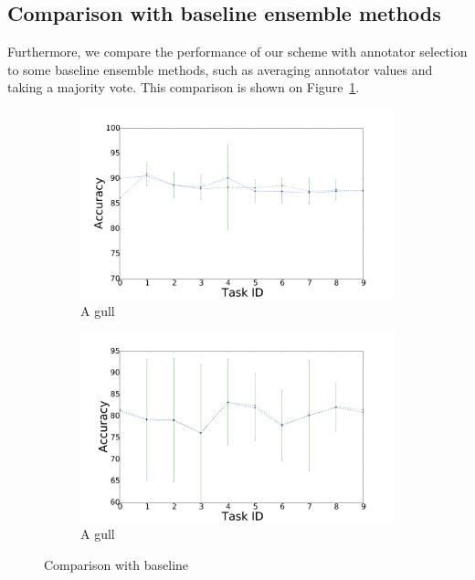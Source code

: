 \documentclass{llncs}
\begin{document}
\subsection{Comparison with baseline ensemble methods}

Furthermore, we compare the performance of our scheme with annotator selection to some baseline ensemble methods, such as averaging annotator values and taking a majority vote. %
This comparison is shown on Figure~\ref{fig:baseline}.

\begin{figure}[!htb]
    \centering
    \begin{subfigure}[b]{0.45\textwidth}
        \includegraphics[width=\textwidth]{figures/comp_average}
        \caption{A gull}
    \end{subfigure}
    \begin{subfigure}[b]{0.45\textwidth}
        \includegraphics[width=\textwidth]{figures/comp_average_mlp}
        \caption{A gull}
    \end{subfigure}
    \caption{Comparison with baseline}
    \label{fig:baseline}
\end{figure}
\end{document}
